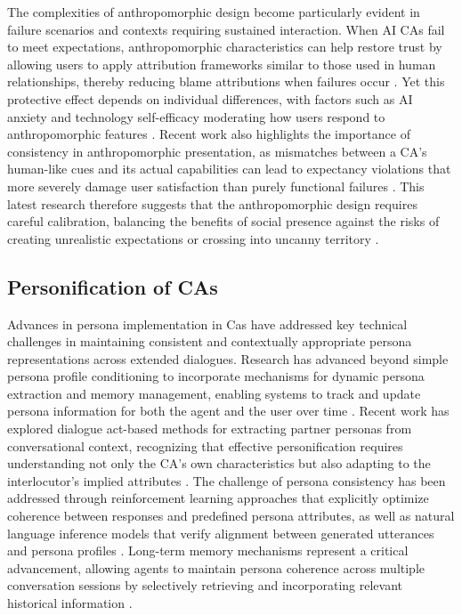 \documentclass{article}
\begin{document}
The complexities of anthropomorphic design become particularly evident in failure scenarios and contexts requiring sustained interaction. When AI CAs fail to meet expectations, anthropomorphic characteristics can help restore trust by allowing users to apply attribution frameworks similar to those used in human relationships, thereby reducing blame attributions when failures occur \citep{liu2024exploring}. Yet this protective effect depends on individual differences, with factors such as AI anxiety and technology self-efficacy moderating how users respond to anthropomorphic features \citep{liu2024exploring,wang2025influence}. Recent work also highlights the importance of consistency in anthropomorphic presentation, as mismatches between a CA's human-like cues and its actual capabilities can lead to expectancy violations that more severely damage user satisfaction than purely functional failures \citep{ischen2024communication,qu2024chatbot}. This latest research therefore suggests that the anthropomorphic design requires careful calibration, balancing the benefits of social presence against the risks of creating unrealistic expectations or crossing into uncanny territory \citep{soni2024chatbot}.

\subsection{Personification of CAs}

Advances in persona implementation in Cas have addressed key technical challenges in maintaining consistent and contextually appropriate persona representations across extended dialogues. Research has advanced beyond simple persona profile conditioning to incorporate mechanisms for dynamic persona extraction and memory management, enabling systems to track and update persona information for both the agent and the user over time \citep{xu2022long,maharana2024evaluating}. Recent work has explored dialogue act-based methods for extracting partner personas from conversational context, recognizing that effective personification requires understanding not only the CA's own characteristics but also adapting to the interlocutor's implied attributes \citep{kim2024dialogue}. The challenge of persona consistency has been addressed through reinforcement learning approaches that explicitly optimize coherence between responses and predefined persona attributes, as well as natural language inference models that verify alignment between generated utterances and persona profiles \citep{shea2023building,yan2023personalized}. Long-term memory mechanisms represent a critical advancement, allowing agents to maintain persona coherence across multiple conversation sessions by selectively retrieving and incorporating relevant historical information \citep{xu2022long,maharana2024evaluating}.
\end{document}

